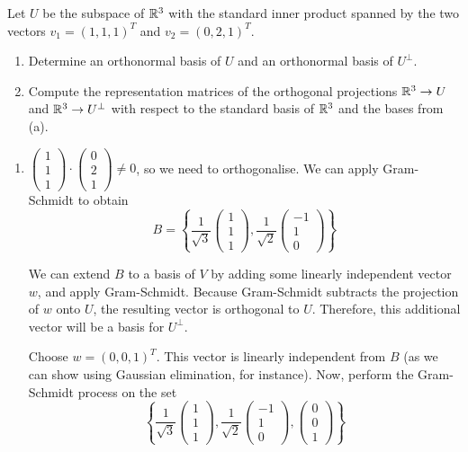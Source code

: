 \documentclass[12pt]{article}
\begin{document}
\begin{problem}{}{}
    Let $U$ be the subspace of $\mathbb{R}^3$ with the standard inner product spanned by the two vectors $v_1 = (1, 1, 1)^T$ and $v_2 = (0, 2, 1)^T$.

    \begin{enumerate}[label=\alph*)]
        \item Determine an orthonormal basis of $U$ and an orthonormal basis of $U^\perp$.
        \item Compute the representation matrices of the orthogonal projections $\mathbb{R}^3 \rightarrow U$ and $\mathbb{R}^3 \rightarrow U^\perp$ with respect to the standard basis of $\mathbb{R}^3$ and the bases from (a).
    \end{enumerate}
\end{problem}

\begin{enumerate}[label=\alph*)]
    \item $\begin{pmatrix} 1 \\ 1 \\ 1 \end{pmatrix} \cdot \begin{pmatrix} 0 \\ 2 \\ 1 \end{pmatrix} \neq 0$, so we need to orthogonalise. We can apply Gram-Schmidt to obtain
    $$
        B = \left\{\frac{1}{\sqrt{3}}\begin{pmatrix} 1 \\ 1 \\ 1 \end{pmatrix}, \frac{1}{\sqrt{2}}\begin{pmatrix} -1 \\ 1 \\ 0 \end{pmatrix} \right\}
    $$

    We can extend $B$ to a basis of $V$ by adding some linearly independent vector $w$, and apply Gram-Schmidt. Because Gram-Schmidt subtracts the projection of $w$ onto $U$, the resulting vector is orthogonal to $U$. Therefore, this additional vector will be a basis for $U^\perp$.

    Choose $w = (0, 0, 1)^T$. This vector is linearly independent from $B$ (as we can show using Gaussian elimination, for instance). Now, perform the Gram-Schmidt process on the set 
    $$
        \left\{ \frac{1}{\sqrt{3}}\begin{pmatrix} 1 \\ 1 \\ 1 \end{pmatrix}, \frac{1}{\sqrt{2}}\begin{pmatrix} -1 \\ 1 \\ 0 \end{pmatrix}, \begin{pmatrix} 0 \\ 0 \\ 1 \end{pmatrix} \right\}
    $$


\end{enumerate}
\end{document}
